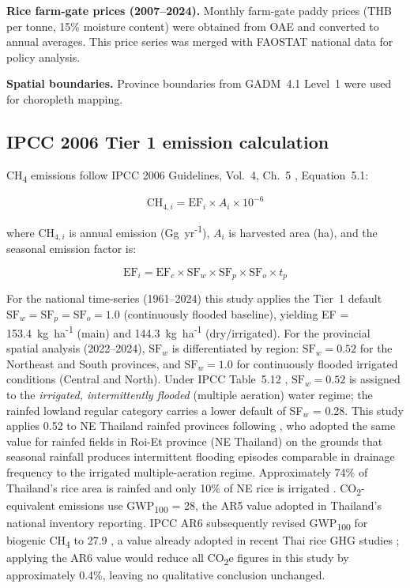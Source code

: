 \documentclass[fleqn,10pt]{olplainarticle}
\begin{document}
\textbf{Rice farm-gate prices (2007--2024).}
Monthly farm-gate paddy prices (THB per tonne, 15\% moisture content) were
obtained from OAE \citep{oae2024} and converted to annual averages.
This price series was merged with FAOSTAT national data for policy analysis.

\textbf{Spatial boundaries.}
Province boundaries from GADM~4.1 Level~1 \citep{gadm2024} were used for
choropleth mapping.

\subsection*{IPCC 2006 Tier 1 emission calculation}

CH\textsubscript{4} emissions follow IPCC 2006 Guidelines, Vol.~4, Ch.~5
\citep{ipcc2006}, Equation~5.1:

\begin{equation}
  \text{CH}_{4,i} = \text{EF}_i \times A_i \times 10^{-6}
  \label{eq:ch4}
\end{equation}

\noindent where $\text{CH}_{4,i}$ is annual emission (Gg~yr\textsuperscript{-1}),
$A_i$ is harvested area (ha), and the seasonal emission factor is:

\begin{equation}
  \text{EF}_i = \text{EF}_c \times \text{SF}_{w} \times \text{SF}_{p}
               \times \text{SF}_{o} \times t_{p}
  \label{eq:ef}
\end{equation}

For the national time-series (1961--2024) this study applies the Tier~1 default
$\text{SF}_w = \text{SF}_p = \text{SF}_o = 1.0$ (continuously flooded baseline),
yielding EF = 153.4~kg~ha\textsuperscript{-1} (main) and 144.3~kg~ha\textsuperscript{-1}
(dry/irrigated).
For the provincial spatial analysis (2022--2024), $\text{SF}_w$ is differentiated
by region: $\text{SF}_w = 0.52$ for the Northeast and South provinces, and
$\text{SF}_w = 1.0$ for continuously flooded irrigated conditions (Central and North).
Under IPCC Table~5.12 \citep{ipcc2006}, $\text{SF}_w = 0.52$ is assigned to the
\textit{irrigated, intermittently flooded} (multiple aeration) water regime;
the rainfed lowland regular category carries a lower default of SF$_w$ = 0.28.
This study applies 0.52 to NE Thailand rainfed provinces following
\citet{arunrat2017}, who adopted the same value for rainfed fields in Roi-Et
province (NE Thailand) on the grounds that seasonal rainfall produces intermittent
flooding episodes comparable in drainage frequency to the irrigated multiple-aeration
regime. Approximately 74\% of Thailand's rice area is rainfed and only 10\% of NE
rice is irrigated \citep{ccac2021}.
CO\textsubscript{2}-equivalent emissions use GWP\textsubscript{100} = 28,
the AR5 value adopted in Thailand's national inventory reporting.
IPCC AR6 subsequently revised GWP\textsubscript{100} for biogenic
CH\textsubscript{4} to 27.9 \citep{forster2021}, a value already adopted in recent
Thai rice GHG studies \citep{sriphirom2023}; applying the AR6 value would
reduce all CO\textsubscript{2}e figures in this study by approximately 0.4\%,
leaving no qualitative conclusion unchanged.
\end{document}
